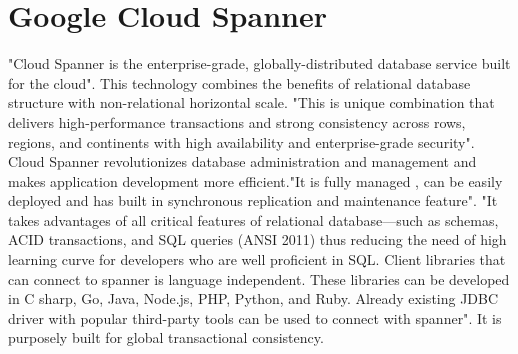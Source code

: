 \section{Google Cloud Spanner}

"Cloud Spanner is the enterprise-grade, globally-distributed database service built for the cloud"\cite{www-google-spanner}. 
This technology combines the benefits of relational database structure with non-relational horizontal scale. "This is unique 
combination that delivers high-performance transactions and strong consistency across rows, regions, and continents with high 
availability and enterprise-grade security"\cite{www-google-spanner}. Cloud Spanner revolutionizes database administration and 
management and makes application development more efficient\cite{www-google-spanner}."It is fully managed , can be easily 
deployed and has built in synchronous replication and maintenance feature"\cite{www-google-spanner}. "It takes advantages of all 
critical features of relational database—such as schemas, ACID transactions, and SQL queries (ANSI 2011) thus reducing the need 
of high learning curve for developers who are well proficient in SQL. Client libraries that can connect to spanner is language
independent. These libraries can be developed in C sharp, Go, Java, Node.js, PHP, Python, and Ruby. Already existing JDBC driver 
with popular third-party tools can be used to connect with spanner"\cite{www-google-spanner}. It is purposely built for 
global transactional consistency.
